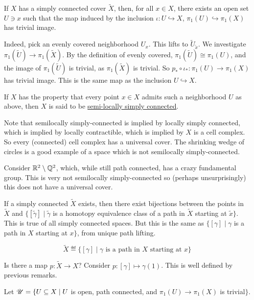 \documentclass[x11names,reqno,14pt]{extarticle}
\begin{document}
\rem

If $X$ has a simply connected cover $\tilde{X}$, then, for all $x \in X$, there exists an open set $U \ni x$ such that the map induced by the inclusion $\iota:U\hookrightarrow X$, $\pi_1(U)\hookrightarrow\pi_1(X)$ has trivial image.

Indeed, pick an evenly covered neighborhood $U_x$. This lifts to $\tilde{U}_{\tilde{x}}$. We investigate $\pi_1(\tilde{U})\to\pi_1(\tilde{X})$. By the definition of evenly covered, $\pi_1(\tilde{U}) \cong \pi_1(U)$, and the image of $\pi_1(\tilde{U})$ is trivial, as $\pi_1(\tilde{X})$ is trivial. So $p_*\circ\iota_*:\pi_1(U)\to\pi_1(X)$ has trivial image. This is the same map as the inclusion $U\hookrightarrow X$. 


If $X$ has the property that every point $x \in X$ admits such a neighborhood $U$ as above, then $X$ is said to be \underline{semi-locally simply connected}. 

\rem

Note that semilocally simply-connected is implied by locally simply connected, which is implied by locally contractible, which is implied by $X$ is a cell complex. So every (connected) cell complex has a universal cover. The shrinking wedge of circles is a good example of a space which is not semilocally simply-connected. 

\rem

Consider $\mathbb{R}^2\setminus\mathbb{Q}^2$, which, while still path connected, has a crazy fundamental group. This is very not semilocally simply-connected so (perhaps unsurprisingly) this does not have a universal cover. 

\rem

If a simply connected $\tilde{X}$ exists, then there exist bijections between the points in $\tilde{X}$ and $\{[\tilde{\gamma}] \mid \tilde{\gamma}$ is a homotopy equivalence class of a path in $\tilde{X}$ starting at $\tilde{x}\}$. This is true of all simply connected spaces. But this is the same as $\{[\gamma]\mid \gamma$ is a path in $X$ starting at $x\}$, from unique path lifting. 

\[
\tilde{X}\eqdef\{[\gamma] \mid \gamma \text{ is a path in $X$ starting at $x$}\}
\]

Is there a map $p:\tilde{X}\to X$? Consider $p:[\gamma]\mapsto \gamma(1)$. This is well defined by previous remarks. 

Let $\mathscr{U} = \{U \subseteq X \mid U$ is open, path connected, and $\pi_1(U)\to\pi_1(X)$ is trivial$\}$.
\end{document}

